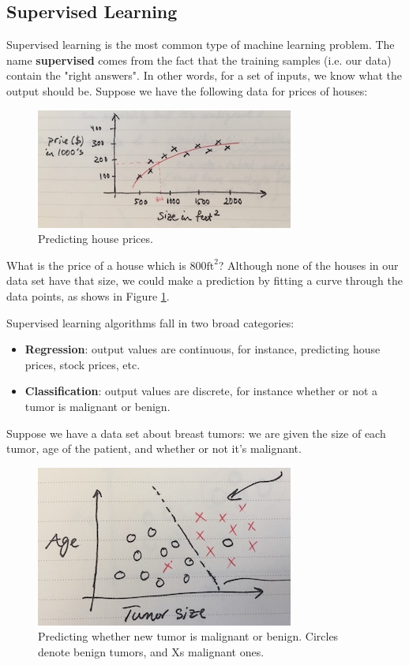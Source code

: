 \documentclass{article}
\begin{document}
\subsection{Supervised Learning}
Supervised learning is the most common type of machine learning problem. The name \textbf{supervised} comes from the fact that the training samples (i.e. our data) contain the "right answers". In other words, for a set of inputs, we know what the output should be. Suppose we have the following data for prices of houses:

\begin{figure}[ht]
\centering
\includegraphics[scale=0.8]{images/intro/house-prices.jpg}
\caption{Predicting house prices.}
\label{into-house-prices}
\end{figure}

What is the price of a house which is $800 \text{ft}^2$? Although none of the houses in our data set have that size, we could make a prediction by fitting a curve through the data points, as shows in Figure \ref{into-house-prices}.

Supervised learning algorithms fall in two broad categories:
\begin{itemize}
    \item \textbf{Regression}: output values are continuous, for instance, predicting house prices, stock prices, etc.
    \item \textbf{Classification}: output values are discrete, for instance whether or not a tumor is malignant or benign.
\end{itemize}

Suppose we have a data set about breast tumors: we are given the size of each tumor, age of the patient, and whether or not it's malignant.

\begin{figure}[ht]
\centering
\includegraphics[scale=0.8]{images/intro/tumor.jpg}
\caption{Predicting whether new tumor is malignant or benign. Circles denote benign tumors, and Xs malignant ones.}
\label{intro-tumor}
\end{figure}
\end{document}
